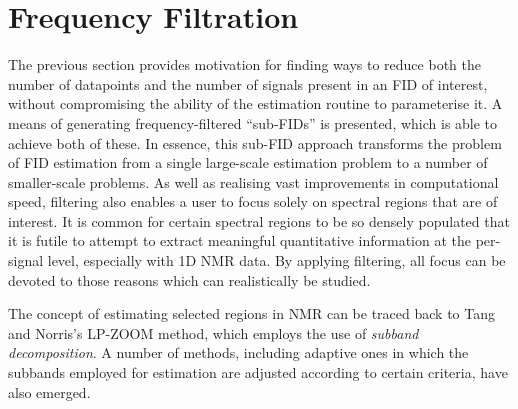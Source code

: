 \section{Frequency Filtration}
\label{sec:filtering}
The previous section provides motivation for finding ways to reduce both the
number of datapoints and the number of signals present in an \ac{FID} of
interest, without compromising the ability of the estimation routine
to parameterise it. A means of generating frequency-filtered ``sub-\acp{FID}''
is presented, which is able to achieve both of these. In essence, this
sub-\ac{FID} approach transforms the problem of \ac{FID} estimation from a
single large-scale estimation problem to a number of smaller-scale problems.
As well as realising vast improvements in computational speed, filtering also
enables a user to focus solely on spectral regions that are of interest.
It is common for certain spectral regions to be so densely populated
that it is futile to attempt to extract meaningful quantitative information at
the per-signal level, especially with \ac{1D} \ac{NMR} data. By applying
filtering, all focus can be devoted to those reasons which can realistically be
studied.

The concept of estimating selected regions in \ac{NMR} can be traced back to
Tang and Norris's \ac{LP}-ZOOM method\cite{Tang1988}, which employs the use of
\textit{subband decomposition}. A number of methods, including adaptive ones
in which the subbands employed for estimation are adjusted according to certain
criteria, have also emerged.


